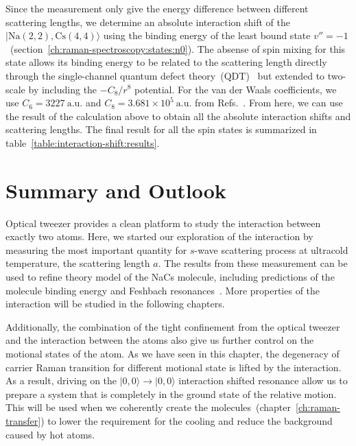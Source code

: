 Since the measurement only give the energy difference between different scattering lengths,
we determine an absolute interaction shift of the $|\mathrm{Na(2, 2),Cs(4, 4)}\rangle$
using the binding energy of
the least bound state $v''=-1$~(section~\ref{ch:raman-spectroscopy:states:n0}).
The absense of spin mixing for this state allows its binding energy to be related
to the scattering length directly through
the single-channel quantum defect theory~(QDT)~\cite{
  gao_quantum-defect_1998,gao_angular-momentum-insensitive_2001,gao_general_2008}
but extended to two-scale by including the $-C_8/r^8$ potential.
For the van der Waals coefficients, we use $C_6=3227~\mathrm{a.u.}$ and
$C_8=3.681\times10^5~\mathrm{a.u.}$ from
Refs.~\cite{docenko_coupling_2006,mcguyer_high-precision_2015,porsev_accurate_2003}.
From here, we can use the result of the calculation above to obtain all the
absolute interaction shifts and scattering lengths.
The final result for all the spin states is summarized in
table~\ref{table:interaction-shift:results}.

\section{Summary and Outlook}
\label{ch:interaction-shift:summary}
Optical tweezer provides a clean platform to study the interaction between exactly two atoms.
Here, we started our exploration of the interaction by measuring the most important quantity
for $s$-wave scattering process at ultracold temperature, the scattering length $a$.
The results from these measurement can be used to refine theory model of the NaCs molecule,
including predictions of the molecule binding energy
and Feshbach resonances~\cite{hood_multichannel_2020}.
More properties of the interaction will be studied in the following chapters.

Additionally, the combination of the tight confinement from the optical tweezer
and the interaction between the atoms also give us further control
on the motional states of the atom.
As we have seen in this chapter, the degeneracy of carrier Raman transition
for different motional state is lifted by the interaction.
As a result, driving on the $|0,0\rangle\rightarrow|0,0\rangle$ interaction shifted resonance
allow us to prepare a system that is completely in the ground state of the relative motion.
This will be used when we coherently create the molecules~(chapter~\ref{ch:raman-transfer})
to lower the requirement for the cooling and reduce the background caused by hot atoms.
